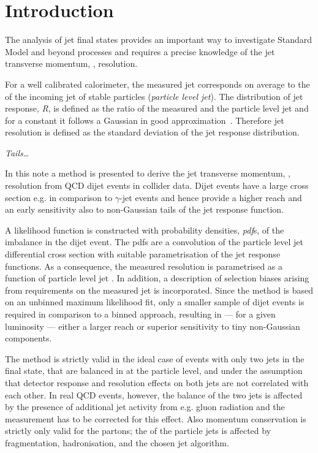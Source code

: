 

\section{Introduction}

The analysis of jet final states provides an important way to investigate Standard Model and beyond processes and requires a precise knowledge of the jet transverse momentum, \textit{\pt}, resolution.

For a well calibrated calorimeter, the measured jet \pt corresponds on average to the \pt of the incoming jet of stable particles (\textit{particle level jet}).
The distribution of jet response, \textit{R}, is defined as the ratio of the measured and the particle level jet \pt and for a constant \ptparticle it follows a Gaussian in good approximation~\cite{jetopgraphy}.
Therefore jet resolution is defined as the standard deviation of the jet response distribution.

\textit{Tails\ldots}

In this note a method is presented to derive the jet transverse momentum, \pt, resolution from QCD dijet events in collider data.
Dijet events have a large cross section e.g. in comparison to $\gamma$-jet events and hence provide a higher \pt reach and an early sensitivity also to non-Gaussian tails of the jet response function.

A likelihood function is constructed with probability densities, \textit{pdf}s, of the \pt imbalance in the dijet event.
The pdfs are a convolution of the particle level jet differential cross section with suitable parametrisation of the jet \pt response functions.
As a consequence, the measured resolution is parametrised as a function of particle level jet \pt.
In addition, a description of selection biases arising from requirements on the measured jet \pt is incorporated.
Since the method is based on an unbinned maximum likelihood fit, only a smaller sample of dijet events is required in comparison to a binned approach, resulting in --- for a given luminosity --- either a larger \pt reach or superior sensitivity to tiny non-Gaussian components.

The method is strictly valid in the ideal case of events with only two jets in the final state, that are balanced in \pt at the particle level, and under the assumption that detector response and resolution effects on both jets are not correlated with each other.
In real QCD events, however, the \pt balance of the two jets is affected by the presence of additional jet activity from e.g. gluon radiation and the measurement has to be corrected for this effect.
Also momentum conservation is strictly only valid for the partons; the \pt of the particle jets is affected by fragmentation, hadronisation, and the chosen jet algorithm.


